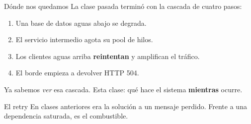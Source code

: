 \documentclass[institutional,screen,none]{ua-engineering-v6-beamer}
\begin{document}
\begin{frame}{Dónde nos quedamos}
La clase pasada terminó con la cascada de cuatro pasos:
\begin{enumerate}
\item Una base de datos aguas abajo se degrada.
\item El servicio intermedio agota su pool de hilos.
\item Los clientes aguas arriba \textbf{reintentan} y amplifican el tráfico.
\item El borde empieza a devolver HTTP 504.
\end{enumerate}

Ya sabemos \emph{ver} esa cascada. Esta clase: qué hace el sistema \textbf{mientras} ocurre.

\begin{alertblock}{El retry}
En clases anteriores era la solución a un mensaje perdido. Frente a una dependencia saturada, es el combustible.
\end{alertblock}
\end{frame}
\end{document}
